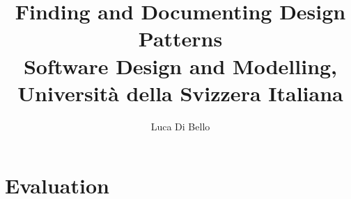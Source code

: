 \documentclass[a4paper, 11pt]{article}
\title{Finding and Documenting Design Patterns\\
\large Software Design and Modelling, Università della Svizzera Italiana}
\author{Luca Di Bello}
\date{\displaydate{today}}
\begin{document}
\maketitle





\pagebreak

\section{Evaluation}

\printbibliography
\end{document}
